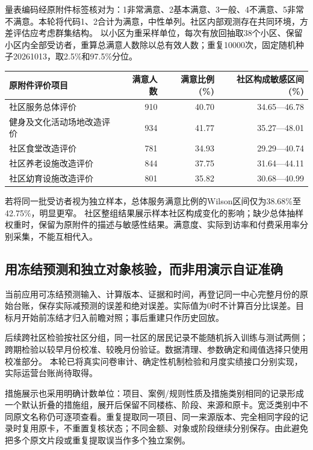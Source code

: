 量表编码经原附件标签核对为：1非常满意、2基本满意、3一般、4不满意、5非常不满意。本轮将代码1、2合计为满意，中性单列。社区内部观测存在共同环境，方差评估应考虑群集结构。\cite{cdcvariance} 以小区为重采样单位，每次有放回抽取38个小区、保留小区内全部受访者，重算总满意人数除以总有效人数；重复10000次，固定随机种子20261013，取2.5\%和97.5\%分位。

\begin{center}\small
\begin{tabular}{@{}L{48mm}rrr@{}}
\toprule 原附件评价项目 & 满意人数 & 满意比例(\%) & 社区构成敏感区间(\%)\\\midrule

社区服务总体评价 & 910 & 40.70 & 34.65—46.78\\
健身及文化活动场地改造评价 & 934 & 41.77 & 35.27—48.01\\
社区食堂改造评价 & 781 & 34.93 & 29.29—40.74\\
社区养老设施改造评价 & 844 & 37.75 & 31.64—44.11\\
社区幼育设施改造评价 & 801 & 35.82 & 30.68—40.99\\
\bottomrule\end{tabular}\end{center}
若将同一批受访者视为独立样本，总体服务满意比例的Wilson区间仅为38.68\%至42.75\%，明显更窄。\cite{nistwilson} 社区整组结果展示样本社区构成变化的影响；缺少总体抽样权重时，保留为原附件的描述与敏感性结果。满意度、实际到访率和付费采用率分别采集，不能互相代入。

\subsection{用冻结预测和独立对象核验，而非用演示自证准确}

当前应用可冻结预测输入、计算版本、证据和时间，再登记同一中心完整月份的原始台账，保存实际减预测的误差和绝对误差。实际值为0时不计算百分比误差。目标月开始前冻结才归入前瞻对照；事后重建只作历史回放。

后续跨社区检验按社区分组，同一社区的居民记录不能随机拆入训练与测试两侧；跨期检验以较早月份校准、较晚月份验证。数据清理、参数确定和阈值选择只使用校准部分。\cite{groupcv} 本轮已将真实问卷审计、确定性机制检验和月度实绩接口分别实现，实际运营台账尚待取得。

措施展示也采用明确计数单位：项目、案例/规则性质及措施类别相同的记录形成一个默认折叠的措施组，展开后保留不同楼栋、阶段、来源和原卡。宽泛类别中不同原文名称仍可逐项查看。重复提取同一项目、同一来源版本、完全相同字段的记录时复用原卡，不重置复核状态；不同金额、对象或阶段继续分别保存。由此避免把多个原文片段或重复提取误当作多个独立案例。

